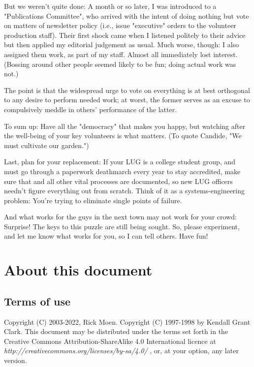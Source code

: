 \documentclass{HOWTO}
\begin{document}
But we weren't quite done:  A month or so later, I was introduced to a 
"Publications Committee", who arrived with the intent of doing nothing but 
vote on matters of newsletter policy (i.e., issue "executive" orders to the 
volunteer production staff).  Their first shock came when I listened politely 
to their advice but then applied my editorial judgement as usual.  Much 
worse, though:  I also assigned them work, as part of my staff.  Almost 
all immediately lost interest. (Bossing around other people seemed likely 
to be fun; doing actual work was not.)

The point is that the widespread urge to vote on everything is at best
orthogonal to any desire to perform needed work; at worst, the former
serves as an excuse to compulsively meddle in others' performance
of the latter.

To sum up:  Have all the "democracy" that makes you happy, but watching after
the well-being of your key volunteers is what matters.  (To quote Candide, 
"We must cultivate our garden.")

Last, plan for your replacement:  If your LUG is a college student
group, and must go through a paperwork deathmarch every year to stay
accredited, make sure that and all other vital processes are documented,
so new LUG officers needn't figure everything out from scratch.  Think
of it as a systems-engineering problem:  You're trying to eliminate
single points of failure.

And what works for the guys in the next town may not work for your crowd:
Surprise!  The keys to this puzzle are still being sought.  So, please
experiment, and let me know what works for you, so I can tell others.
Have fun!




\section{About this document}


\subsection{Terms of use}



Copyright (C) 2003-2022, Rick Moen.  Copyright (C) 1997-1998 by Kendall Grant 
Clark. This document may be distributed under the terms set forth 
in the Creative Commons Attribution-ShareAlike 4.0 International licence at 
\emph{http://creativecommons.org/licenses/by-sa/4.0/} \texttt{\aeuurl}
, or, at your
option, any later version.
\end{document}
